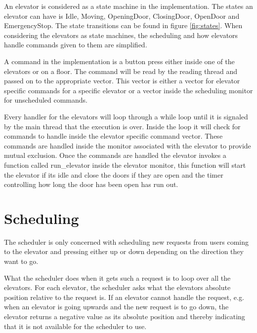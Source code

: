 \documentclass[10pt,a4paper]{article}
\begin{document}
An elevator is considered as a state machine in the implementation. The states an elevator can have is Idle, Moving, OpeningDoor, ClosingDoor, OpenDoor and EmergencyStop. The state transitions can be found in figure \ref{fig:states}. When considering the elevators as state machines, the scheduling and how elevators handle commands given to them are simplified.

A command in the implementation is a button press either inside one of the elevators or on a floor. The command will be read by the reading thread and passed on to the appropriate vector. This vector is either a vector for elevator specific commands for a specific elevator or a vector inside the scheduling monitor for unscheduled commands.

Every handler for the elevators will loop through a while loop until it is signaled by the main thread that the execution is over. Inside the loop it will check for commands to handle inside the elevator specific command vector. These commands are handled inside the monitor associated with the elevator to provide mutual exclusion. Once the commands are handled the elevator invokes a function called run\_elevator inside the elevator monitor, this function will start the elevator if its idle and close the doors if they are open and the timer controlling how long the door has been open has run out.


\section{Scheduling}
\label{sec:scheduling}

The scheduler is only concerned with scheduling new requests from users coming to the elevator and pressing either up or down depending on the direction they want to go.

What the scheduler does when it gets such a request is to loop over all the elevators. For each elevator, the scheduler asks what the elevators absolute position relative to the request is. If an elevator cannot handle the request, e.g. when an elevator is going upwards and the new request is to go down, the elevator returns a negative value as its absolute position and thereby indicating that it is not available for the scheduler to use.
\end{document}
